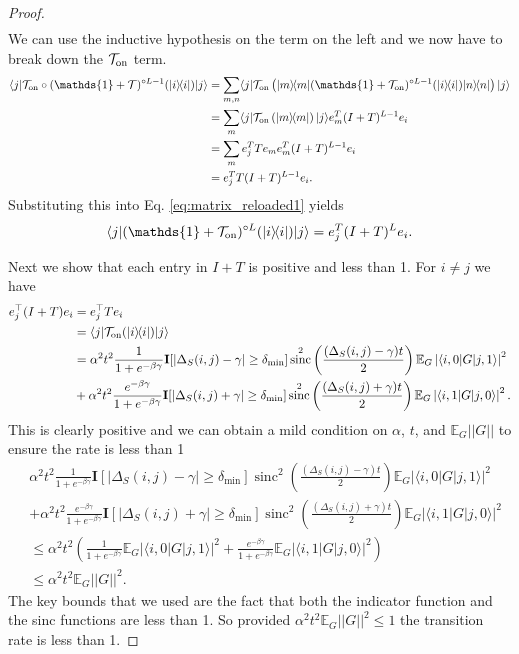 \documentclass[
 amsmath,amssymb,
 aps,
onecolumn, 
nofootinbib]{revtex4-2}
\newcommand{\on}{\rm on}
\newcommand{\ket}[1]{|#1\rangle}
\newcommand{\bra}[1]{\langle #1|}
\newcommand{\ketbra}[2]{| #1\rangle\! \langle #2|}
\newcommand{\abs}[1]{\left| #1 \right|}
\newcommand{\norm}[1]{\left|\left| #1 \right|\right|}
\newcommand{\EE}{\mathbb{E}}
\newcommand{\identity}{\mathds{1}}
\DeclareMathOperator{\sinc}{sinc}
\begin{document}
\begin{proof}
\begin{align}
\end{align}
We can use the inductive hypothesis on the term on the left and we now have to break down the $\mathcal{T}_{\on}$ term. 
\begin{align}
    \bra{j} \mathcal{T}_{\on} \circ (\identity + \mathcal{T})^{\circ L - 1} (\ketbra{i}{i}) \ket{j} &= \sum_{m, n} \bra{j} \mathcal{T}_{\on}\left( \ketbra{m}{m} (\identity + \mathcal{T}_{\on})^{\circ L - 1} (\ketbra{i}{i}) \ketbra{n}{n} \right) \ket{j} \\
    &= \sum_{m} \bra{j} \mathcal{T}_{\on} \left( \ketbra{m}{m} \right) \ket{j} e_m^T (I + T)^{L - 1} e_i \\
    &= \sum_m e_j^T T e_m e_m^T (I + T)^{L -1} e_i \\
    &= e_j^T T(I + T)^{L-1} e_i.
\end{align}
Substituting this into Eq. \eqref{eq:matrix_reloaded1} yields \begin{equation}
     \bra{j} (\identity + \mathcal{T}_{\on})^{\circ L}(\ketbra{i}{i}) \ket{j} = e_j^T (I + T)^{L} e_i.
\end{equation} 

Next we show that each entry in $I + T$ is positive and less than 1. For $i \neq j$ we have
\begin{align}
    e_j^\top (I + T) e_i &= e_j^\top T e_i \nonumber \\
    &= \bra{j}\mathcal{T}_{\on}(\ketbra{i}{i})\ket{j} \nonumber \\
    & =\alpha^2 t^2 \frac{1}{1 + e^{-\beta \gamma}} \mathbf{I}[\abs{\Delta_S(i,j) - \gamma} \ge \delta_{\min}] \sinc^2 \left( \frac{(\Delta_S(i,j) - \gamma) t}{2}\right) \EE_G \abs{\bra{i,0} G \ket{j,1}}^2 \nonumber \\
    &+ \alpha^2 t^2 \frac{e^{-\beta \gamma}}{1 + e^{-\beta \gamma}} \mathbf{I}[\abs{\Delta_S(i,j) + \gamma} \ge \delta_{\min}] \sinc^2 \left( \frac{(\Delta_S(i,j) + \gamma) t}{2}\right) \EE_G \abs{\bra{i,1} G \ket{j,0}}^2.
\end{align}
This is clearly positive and we can obtain a mild condition on $\alpha$, $t$, and $\EE_G \norm{G}$ to ensure the rate is less than 1
\begin{align}
    & \alpha^2 t^2 \frac{1}{1 + e^{-\beta \gamma}} \mathbf{I}[\abs{\Delta_S(i,j) - \gamma} \ge \delta_{\min}] \sinc^2 \left( \frac{(\Delta_S(i,j) - \gamma) t}{2}\right) \EE_G \abs{\bra{i,0} G \ket{j,1}}^2 \nonumber \\
    &+ \alpha^2 t^2 \frac{e^{-\beta \gamma}}{1 + e^{-\beta \gamma}} \mathbf{I}[\abs{\Delta_S(i,j) + \gamma} \ge \delta_{\min}] \sinc^2 \left( \frac{(\Delta_S(i,j) + \gamma) t}{2}\right) \EE_G \abs{\bra{i,1} G \ket{j,0}}^2 \nonumber \\
    &\le \alpha^2 t^2 \left( \frac{1}{1 + e^{-\beta \gamma}} \EE_G \abs{\bra{i,0} G \ket{j,1}}^2 + \frac{e^{-\beta \gamma}}{1 + e^{-\beta \gamma}} \EE_G \abs{\bra{i,1} G \ket{j,0}}^2\right) \\
    &\le \alpha^2 t^2 \EE_G \norm{G}^2.
\end{align}
The key bounds that we used are the fact that both the indicator function and the sinc functions are less than 1. So provided $\alpha^2 t^2 \EE_G \norm{G}^2 \le 1$ the transition rate is less than 1.


\end{proof}
\end{document}
